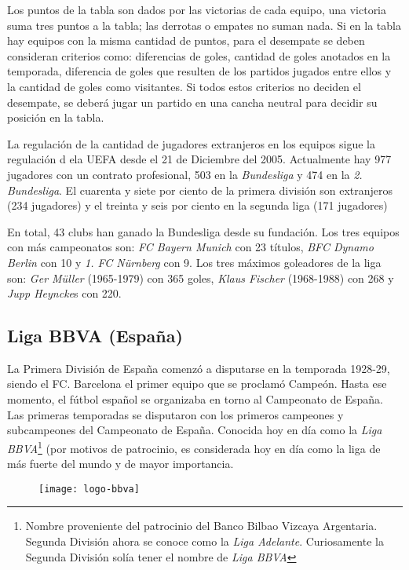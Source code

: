 Los puntos de la tabla son dados por las victorias de cada equipo, una victoria suma tres puntos a la tabla; las derrotas o empates no suman nada. Si en la tabla hay equipos con la misma cantidad de puntos, para el desempate se deben consideran criterios como: diferencias de goles, cantidad de goles anotados en la temporada,  diferencia de goles que resulten de los partidos jugados entre ellos y la cantidad de goles como visitantes. Si todos estos criterios no deciden el desempate, se deberá jugar un partido en una cancha neutral para decidir su posición en la tabla.

La regulación de la cantidad de jugadores extranjeros en los equipos sigue la regulación d ela UEFA desde el 21 de Diciembre del 2005. Actualmente hay 977 jugadores con un contrato profesional, 503 en la \emph{Bundesliga} y 474 en la \emph{2. Bundesliga}. El cuarenta y siete por ciento de la primera división son extranjeros (234 jugadores) y el treinta y seis por ciento  en la segunda liga (171 jugadores)

En total, 43 clubs han ganado la Bundesliga desde su fundación. Los tres equipos con más campeonatos son: \emph{FC Bayern Munich} con 23 títulos, \emph{BFC Dynamo Berlin} con 10 y \emph{1. FC Nürnberg} con 9. Los tres máximos goleadores de la liga son: \emph{Ger Müller} (1965-1979) con 365 goles, \emph{Klaus Fischer} (1968-1988) con 268 y \emph{Jupp Heyncke}s con 220. \cite{bundesliga}

\subsection{Liga BBVA (España)}

La Primera División de España comenzó a disputarse en la temporada 1928-29, siendo el FC. Barcelona el primer equipo que se proclamó Campeón. Hasta ese momento, el fútbol español se organizaba en torno al Campeonato de España. Las primeras temporadas se disputaron con los primeros campeones y subcampeones del Campeonato de España. Conocida hoy en día como la \emph{Liga BBVA}\footnote{Nombre proveniente del patrocinio del Banco Bilbao Vizcaya Argentaria. Segunda División ahora se conoce como la \emph{Liga Adelante}. Curiosamente la Segunda División solía tener el nombre de \emph{Liga BBVA} } (por motivos de patrocinio, es considerada hoy en día como la liga de más fuerte del mundo y de mayor importancia. \cite{strongest-league}

\begin{figure}[!htb]\centering
   \begin {minipage}{0.5\textwidth}
     \texttt{[image: logo-bbva]}
   \end{minipage}
\end{figure}

